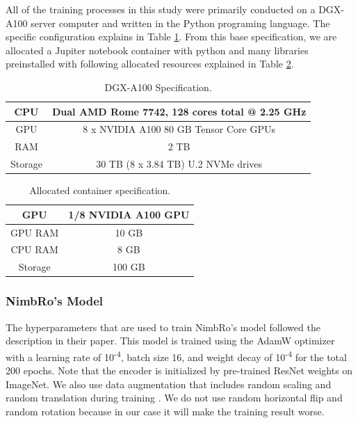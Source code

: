 All of the training processes in this study were primarily conducted on a DGX-A100 server computer and written in the Python programing language. The specific configuration explains in Table \ref{tb:dgxa100}.
From this base specification, we are allocated a Jupiter notebook container with
python and many libraries preinstalled with following allocated resources explained in Table \ref{tb:allocatedcontainer}.
\begin{longtable}{|c|c|}
  \caption{DGX-A100 Specification.}
  \label{tb:dgxa100}\\
  \hline
  CPU     & Dual AMD Rome 7742, 128 cores total @ 2.25 GHz \\
  \hline
  GPU     & 8 x NVIDIA A100 80 GB Tensor Core GPUs  \\
  \hline
  RAM     & 2 TB \\
  \hline
  Storage & 30 TB (8 x 3.84 TB) U.2 NVMe drives \\
  \hline
\end{longtable}

\begin{longtable}{|c|c|}
  \caption{Allocated container specification.}
  \label{tb:allocatedcontainer}\\
  \hline
  GPU     & 1/8 NVIDIA A100 GPU \\
  \hline
  GPU RAM & 10 GB  \\
  \hline
  CPU RAM & 8 GB \\
  \hline
  Storage & 100 GB  \\
  \hline
\end{longtable}

\subsubsection{NimbRo's Model}
\label{subsubsec:training-nimbro-model}

The hyperparameters that are used to train NimbRo's model followed the description in their paper.
This model is trained using the AdamW optimizer with a learning rate of 10\textsuperscript{-4},
batch size 16, and weight decay of 10\textsuperscript{-4} for the total 200 epochs.
Note that the encoder is initialized by pre-trained ResNet weights on ImageNet.
We also use data augmentation that includes random scaling and random translation during training \parencite{amini2021}.
We do not use random horizontal flip and random rotation because in our case it will make the training result worse.


